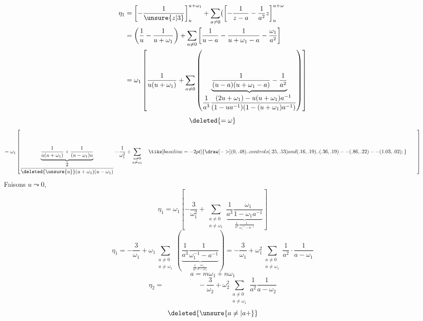 \[
\begin{aligned}
\eta_1&=\left[-\frac1{\unsure{z|3}}\right]_u^{u+\omega_1}
+\sum_{a\ne0}\bigl(\left[-\frac1{z-a}-\frac1{a^2}z\right]_u^{u+\omega}\\
&=\left(\frac1u-\frac1{u+\omega_1}\right)
+\sum_{a\ne0}\left[\frac1{u-a}-\frac1{u+\omega_1-a}-\frac{\omega_1}{a^2}\right]\\
&=\omega_1\left[\frac1{u(u+\omega_1)}+
\sum_{a\ne0}\left(\underbrace{\frac1{(u-a)(u+\omega_1-a)}-\frac1{a^2}}_{
\displaystyle\frac1{a^3}\frac{(2u+\omega_1)-u(u+\omega_1)a^{-1}}{(1-ua^{-1})(1-(u+\omega_1)a^{-1})}}\right)\right]
\end{aligned}
\]
\[
\deleted{=\omega}
\]
\[
=\omega_1\left[\underbrace{\frac1{u(u+\omega_1)}+\frac1{(u-\omega_1)u}}_{
\displaystyle\frac2{\deleted{\unsure{u}}(u+\omega_1)(u-\omega_1)}}
-\frac1{\omega_1^2}+\sum_{\substack{a\ne0\\ a\ne\omega_1}}
\quad\tikz[baseline=-2pt]{\draw[->] (0,.48) .. controls (.25,.53) and (.16,.19) .. (.36,.19) -- (.86,.22) -- (1.03,.02);}\qquad\right]
\]
Faisons $u\leadsto0$, 
\[
\eta_1=\omega_1\left[-\frac3{\omega_1^2}
+\sum_{\substack{a\ne0\\a\ne\omega_1}}
\underbrace{\frac1{a^3}\frac{\omega_1}{1-\omega_1a^{-1}}}_{
\displaystyle\frac1{a^3}\frac1{\omega_1^{-1}-a^{-1}}}\right]
\]
\[
\eta_1=-\frac3{\omega_1}+
\omega_1\sum_{\substack{a\ne0\\a\ne\omega_1}}
\left(\underbrace{\frac1{a^3}\frac1{\omega_1^{-1}-a^{-1}}}_{
\displaystyle\frac1{a^2}\frac{\omega_1}{a-\omega_1}}\right)
=-\frac3{\omega_1}+\omega_1^2\sum_{\substack{a\ne0\\a\ne\omega_1}}
\frac1{a^2}\cdot\frac1{a-\omega_1}
\]
\[
a=m\omega_1+n\omega_1
\]
\[
\eta_2=\hspace{5em}-\frac3{\omega_2}+\omega_2^2\sum_{\substack{a\ne0\\a\ne\omega_1}}
\frac1{a^2}\frac1{a-\omega_2}
\]
\[
\deleted{\unsure{a\ne|a+}}
\]


